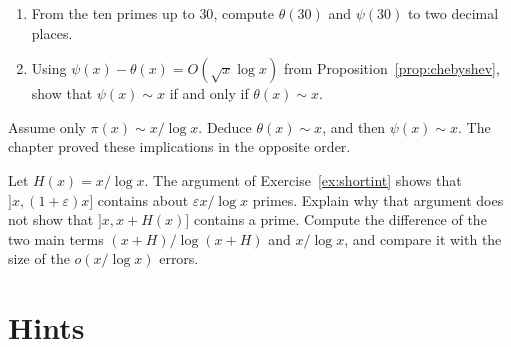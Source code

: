 \begin{exercise}[$\star\star$]\label{ex:thetaequiv}
\begin{enumerate}[label=(\alph*)]
\item From the ten primes up to $30$, compute $\theta(30)$ and $\psi(30)$ to two decimal places.
\item Using $\psi(x)-\theta(x)=O(\sqrt x\log x)$ from Proposition~\ref{prop:chebyshev}, show that $\psi(x)\sim x$ if and only if $\theta(x)\sim x$.
\end{enumerate}
\end{exercise}

\begin{exercise}[$\star\star$]\label{ex:frompi}
Assume only $\pi(x)\sim x/\log x$. Deduce $\theta(x)\sim x$, and then $\psi(x)\sim x$. The chapter proved these implications in the opposite order.
\end{exercise}

\begin{exercise}[$\star\star\star$]\label{ex:shorter}
Let $H(x)=x/\log x$. The argument of Exercise~\ref{ex:shortint} shows that $]x,(1+\varepsilon)x]$ contains about $\varepsilon x/\log x$ primes. Explain why that argument does not show that $]x,x+H(x)]$ contains a prime. Compute the difference of the two main terms $(x+H)/\log(x+H)$ and $x/\log x$, and compare it with the size of the $o(x/\log x)$ errors.
\end{exercise}

\section{Hints}

